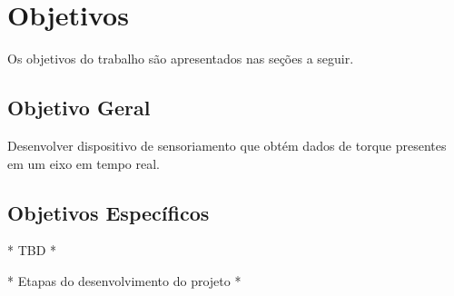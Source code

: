 \section{Objetivos}

Os objetivos do trabalho são apresentados nas seções a seguir.

\subsection{Objetivo Geral}

Desenvolver dispositivo de sensoriamento que obtém dados de torque presentes em um eixo em tempo real.

\subsection{Objetivos Específicos}

* TBD *

* Etapas do desenvolvimento do projeto *

%
%
%
%
%
%




